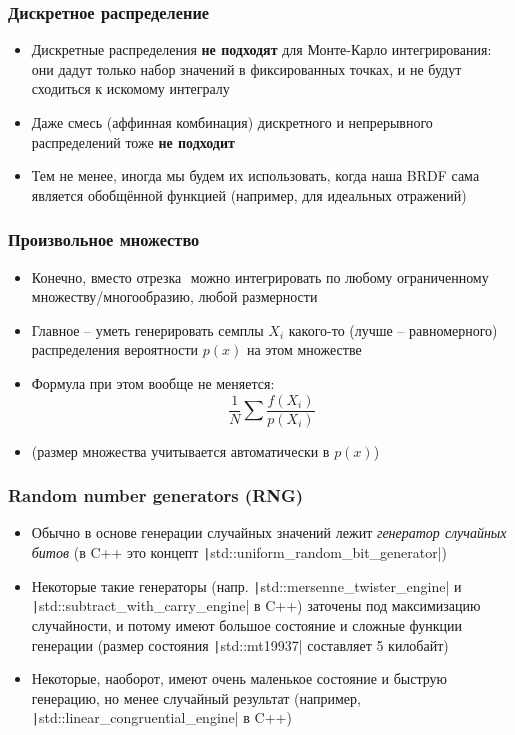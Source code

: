 \documentclass[handout,10pt]{beamer}
\begin{document}
\begin{frame}[fragile]
\frametitle{Дискретное распределение}
\begin{itemize}
\item Дискретные распределения \textbf{не подходят} для Монте-Карло интегрирования: они дадут только набор значений в фиксированных точках, и не будут сходиться к искомому интегралу
\pause
\item Даже смесь (аффинная комбинация) дискретного и непрерывного распределений тоже \textbf{не подходит}
\pause
\item Тем не менее, иногда мы будем их использовать, когда наша BRDF сама является обобщённой функцией (например, для идеальных отражений)
\end{itemize}
\end{frame}

\begin{frame}[fragile]
\frametitle{Произвольное множество}
\begin{itemize}
\item Конечно, вместо отрезка \begin{math}[a,b]\end{math} можно интегрировать по любому ограниченному множеству/многообразию, любой размерности
\pause
\item Главное -- уметь генерировать семплы \begin{math}X_i\end{math} какого-то (лучше -- равномерного) распределения вероятности \begin{math}p(x)\end{math} на этом множестве
\pause
\item Формула при этом вообще не меняется:
\begin{equation*}
\frac{1}{N}\sum \frac{f(X_i)}{p(X_i)}
\end{equation*}
\pause
\item (размер множества учитывается автоматически в \begin{math}p(x)\end{math})
\end{itemize}
\end{frame}

\begin{frame}[fragile]
\frametitle{Random number generators (RNG)}
\begin{itemize}
\item Обычно в основе генерации случайных значений лежит \textit{генератор случайных битов} (в C++ это концепт \texttt|std::uniform_random_bit_generator|)
\pause
\item Некоторые такие генераторы (напр. \texttt|std::mersenne_twister_engine| и \texttt|std::subtract_with_carry_engine| в C++) заточены под максимизацию случайности, и потому имеют большое состояние и сложные функции генерации (размер состояния \texttt|std::mt19937| составляет 5 килобайт)
\pause
\item Некоторые, наоборот, имеют очень маленькое состояние и быструю генерацию, но менее случайный результат (например, \texttt|std::linear_congruential_engine| в C++)
\end{itemize}
\end{frame}
\end{document}
